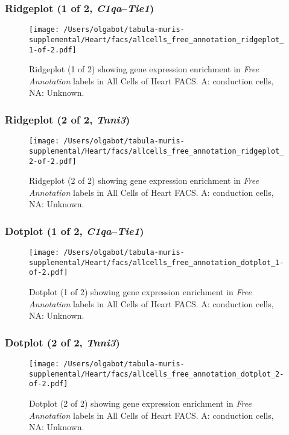 \clearpage

\subsubsection{Ridgeplot (1 of 2, \emph{C1qa}--\emph{Tie1})}
\begin{figure}[h]
\centering
\texttt{[image: /Users/olgabot/tabula-muris-supplemental/Heart/facs/allcells\_free\_annotation\_ridgeplot\_1-of-2.pdf]}

\caption{ Ridgeplot (1 of 2)  showing gene expression enrichment in \emph{Free Annotation} labels in All Cells of Heart FACS. A: conduction cells, NA: Unknown.}
\end{figure}


\clearpage

\subsubsection{Ridgeplot (2 of 2, \emph{Tnni3})}
\begin{figure}[h]
\centering
\texttt{[image: /Users/olgabot/tabula-muris-supplemental/Heart/facs/allcells\_free\_annotation\_ridgeplot\_2-of-2.pdf]}

\caption{ Ridgeplot (2 of 2)  showing gene expression enrichment in \emph{Free Annotation} labels in All Cells of Heart FACS. A: conduction cells, NA: Unknown.}
\end{figure}


\clearpage

\subsubsection{Dotplot (1 of 2, \emph{C1qa}--\emph{Tie1})}
\begin{figure}[h]
\centering
\texttt{[image: /Users/olgabot/tabula-muris-supplemental/Heart/facs/allcells\_free\_annotation\_dotplot\_1-of-2.pdf]}

\caption{ Dotplot (1 of 2)  showing gene expression enrichment in \emph{Free Annotation} labels in All Cells of Heart FACS. A: conduction cells, NA: Unknown.}
\end{figure}


\clearpage

\subsubsection{Dotplot (2 of 2, \emph{Tnni3})}
\begin{figure}[h]
\centering
\texttt{[image: /Users/olgabot/tabula-muris-supplemental/Heart/facs/allcells\_free\_annotation\_dotplot\_2-of-2.pdf]}

\caption{ Dotplot (2 of 2)  showing gene expression enrichment in \emph{Free Annotation} labels in All Cells of Heart FACS. A: conduction cells, NA: Unknown.}
\end{figure}


